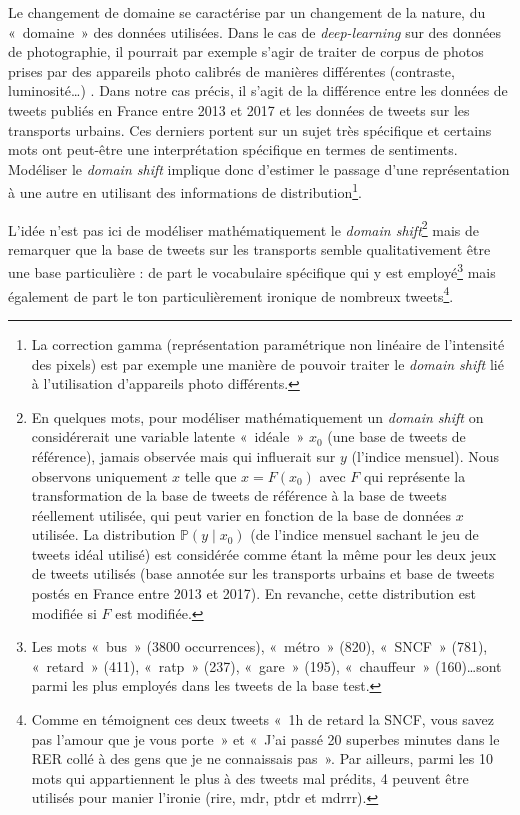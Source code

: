 \documentclass[11pt,french,french]{article}
\let\rmarkdownfootnote\footnote%
\def\footnote{\protect\rmarkdownfootnote}
\begin{document}
Le changement de domaine se caractérise par un changement de la nature,
du «~domaine~» des données utilisées. Dans le cas de
\emph{deep-learning} sur des données de photographie, il pourrait par
exemple s'agir de traiter de corpus de photos prises par des appareils
photo calibrés de manières différentes (contraste, luminosité\dots) .
Dans notre cas précis, il s'agit de la différence entre les données de
tweets publiés en France entre 2013 et 2017 et les données de tweets sur
les transports urbains. Ces derniers portent sur un sujet très
spécifique et certains mots ont peut-être une interprétation spécifique
en termes de sentiments. Modéliser le \emph{domain shift} implique donc
d'estimer le passage d'une représentation à une autre en utilisant des
informations de distribution\footnote{La correction gamma
  (représentation paramétrique non linéaire de l'intensité des pixels)
  est par exemple une manière de pouvoir traiter le \emph{domain shift}
  lié à l'utilisation d'appareils photo différents.}.

L'idée n'est pas ici de modéliser mathématiquement le \emph{domain
shift}\footnote{En quelques mots, pour modéliser mathématiquement un
  \emph{domain shift} on considérerait une variable latente «~idéale~»
  \(x_0\) (une base de tweets de référence), jamais observée mais qui
  influerait sur \(y\) (l'indice mensuel). Nous observons uniquement
  \(x\) telle que \(x=F(x_0)\) avec \(F\) qui représente la
  transformation de la base de tweets de référence à la base de tweets
  réellement utilisée, qui peut varier en fonction de la base de données
  \(x\) utilisée. La distribution \(\mathbb P(y\mid x_0)\) (de l'indice
  mensuel sachant le jeu de tweets idéal utilisé) est considérée comme
  étant la même pour les deux jeux de tweets utilisés (base annotée sur
  les transports urbains et base de tweets postés en France entre 2013
  et 2017). En revanche, cette distribution est modifiée si \(F\) est
  modifiée.} mais de remarquer que la base de tweets sur les transports
semble qualitativement être une base particulière : de part le
vocabulaire spécifique qui y est employé\footnote{Les mots «~bus~» (3800
  occurrences), «~métro~» (820), «~SNCF~» (781), «~retard~» (411),
  «~ratp~» (237), «~gare~» (195), «~chauffeur~» (160)\dots sont parmi
  les plus employés dans les tweets de la base test.} mais également de
part le ton particulièrement ironique de nombreux tweets\footnote{Comme
  en témoignent ces deux tweets «~1h de retard la SNCF, vous savez pas
  l'amour que je vous porte~» et «~J'ai passé 20 superbes minutes dans
  le RER collé à des gens que je ne connaissais pas~». Par ailleurs,
  parmi les 10 mots qui appartiennent le plus à des tweets mal prédits,
  4 peuvent être utilisés pour manier l'ironie (rire, mdr, ptdr et
  mdrrr).}.
\end{document}
